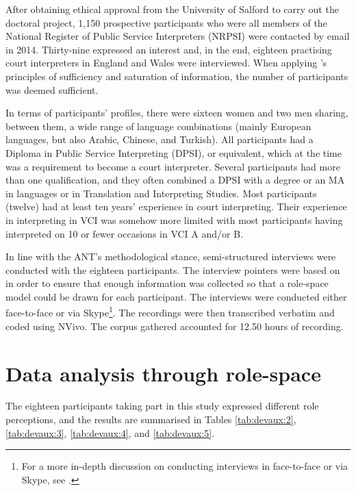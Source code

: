 \documentclass[output=paper]{langsci/langscibook}
\begin{document}
After obtaining ethical approval from the University of Salford to carry out the doctoral project, 1,150 prospective participants who were all members of the National Register of Public Service Interpreters (\textsc{NRPSI}) were contacted by email in 2014. Thirty-nine expressed an interest and, in the end, eighteen practising court interpreters in England and Wales were interviewed. When applying \citet{Seidman2006}’s principles of sufficiency and saturation of information, the number of participants was deemed sufficient. 

In terms of participants’ profiles, there were sixteen women and two men sharing, between them, a wide range of language combinations (mainly European languages, but also Arabic, Chinese, and Turkish). All participants had a Diploma in Public Service Interpreting (\textsc{DPSI}), or equivalent, which at the time was a requirement to become a court interpreter. Several participants had more than one qualification, and they often combined a \textsc{DPSI} with a degree or an MA in languages or in Translation and Interpreting Studies. Most participants (twelve) had at least ten years’ experience in court interpreting. Their experience in interpreting in \textsc{VCI} was somehow more limited with most participants having interpreted on 10 or fewer occasions in \textsc{VCI} A and/or B.   

In line with the \textsc{ANT}’s methodological stance, semi-structured interviews were conducted with the eighteen participants. The interview pointers were based on  in order to ensure that enough information was collected so that a role-space model could be drawn for each participant. The interviews were conducted either face-to-face or via Skype\footnote{For a more in-depth discussion on conducting interviews in face-to-face or via Skype, see \citet{Devaux2017b}.}. The recordings were then transcribed verbatim and coded using NVivo. The corpus gathered accounted for 12.50 hours of recording. 

\section{Data analysis through role-space}
\label{sec:devaux:5}
The eighteen participants taking part in this study expressed different role perceptions, and the results are summarised in Tables \ref{tab:devaux:2}, \ref{tab:devaux:3}, \ref{tab:devaux:4}, and \ref{tab:devaux:5}.
\end{document}
